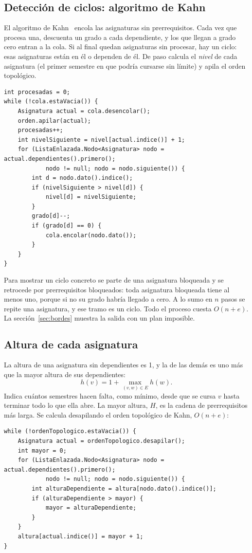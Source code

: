 \documentclass[11pt,letterpaper]{article}
\begin{document}
\subsection{Detección de ciclos: algoritmo de Kahn}
El algoritmo de Kahn~\cite{kahn1962} encola las asignaturas sin prerrequisitos. Cada vez que procesa una, descuenta un grado a cada dependiente, y los que llegan a grado cero entran a la cola. Si al final quedan asignaturas sin procesar, hay un ciclo: esas asignaturas están en él o dependen de él. De paso calcula el \emph{nivel} de cada asignatura (el primer semestre en que podría cursarse sin límite) y apila el orden topológico.
\begin{lstlisting}[style=java]
int procesadas = 0;
while (!cola.estaVacia()) {
    Asignatura actual = cola.desencolar();
    orden.apilar(actual);
    procesadas++;
    int nivelSiguiente = nivel[actual.indice()] + 1;
    for (ListaEnlazada.Nodo<Asignatura> nodo = actual.dependientes().primero();
            nodo != null; nodo = nodo.siguiente()) {
        int d = nodo.dato().indice();
        if (nivelSiguiente > nivel[d]) {
            nivel[d] = nivelSiguiente;
        }
        grado[d]--;
        if (grado[d] == 0) {
            cola.encolar(nodo.dato());
        }
    }
}
\end{lstlisting}

Para mostrar un ciclo concreto se parte de una asignatura bloqueada y se retrocede por prerrequisitos bloqueados: toda asignatura bloqueada tiene al menos uno, porque si no su grado habría llegado a cero. A lo sumo en $n$ pasos se repite una asignatura, y ese tramo es un ciclo. Todo el proceso cuesta $O(n + e)$. La sección~\ref{sec:bordes} muestra la salida con un plan imposible.

\subsection{Altura de cada asignatura}
La altura de una asignatura sin dependientes es 1, y la de las demás es uno más que la mayor altura de sus dependientes:
\[
h(v) = 1 + \max_{(v, w) \in E} h(w).
\]
Indica cuántos semestres hacen falta, como mínimo, desde que se cursa $v$ hasta terminar todo lo que ella abre. La mayor altura, $H$, es la cadena de prerrequisitos más larga. Se calcula desapilando el orden topológico de Kahn, $O(n + e)$:
\begin{lstlisting}[style=java]
while (!ordenTopologico.estaVacia()) {
    Asignatura actual = ordenTopologico.desapilar();
    int mayor = 0;
    for (ListaEnlazada.Nodo<Asignatura> nodo = actual.dependientes().primero();
            nodo != null; nodo = nodo.siguiente()) {
        int alturaDependiente = altura[nodo.dato().indice()];
        if (alturaDependiente > mayor) {
            mayor = alturaDependiente;
        }
    }
    altura[actual.indice()] = mayor + 1;
}
\end{lstlisting}
\end{document}

